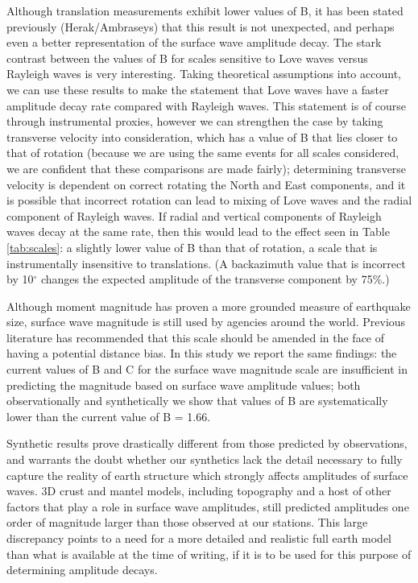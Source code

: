 \documentclass{gji}
\begin{document}
Although translation measurements exhibit lower values of B, it has been stated previously (Herak/Ambraseys) that this result is not unexpected, and perhaps even a better representation of the surface wave amplitude decay. The stark contrast between the values of B for scales sensitive to Love waves versus Rayleigh waves is very interesting. Taking theoretical assumptions into account, we can use these results to make the statement that Love waves have a faster amplitude decay rate  compared with  Rayleigh waves. This statement is of course through instrumental proxies, however we can strengthen the case by taking transverse velocity into consideration, which has a value of B that lies closer to that of rotation (because we are using the same events for all scales considered, we are confident that these comparisons are made fairly); determining transverse velocity is dependent on correct rotating the North and East components, and it is possible that incorrect rotation can lead to mixing of Love waves and the radial component of Rayleigh waves. If radial and vertical components of Rayleigh waves decay at the same rate, then this would lead to the effect seen in Table \ref{tab:scales}: a slightly lower value of B than that of rotation, a scale that is instrumentally insensitive to translations. (A backazimuth value that is incorrect by 10$^\circ$ changes the expected amplitude of the transverse component by 75\%.) %

Although moment magnitude has proven a more grounded measure of earthquake size, surface wave magnitude is still used by agencies around the world. Previous literature has recommended that this scale should be amended in the face of having a potential distance bias. In this study we report the same findings: the current values of B and C for the surface wave magnitude scale are insufficient in predicting the magnitude based on surface wave amplitude values; both observationally and synthetically we show that values of B are systematically lower than the current value of B = 1.66.

Synthetic results prove drastically different from those predicted by observations, and warrants the doubt whether our synthetics lack the detail necessary to fully capture the reality of earth structure which strongly affects amplitudes of surface waves. 3D crust and mantel models, including topography and a host of other factors that play a role in surface wave amplitudes, still predicted amplitudes one order of magnitude larger than those observed at our stations. This large discrepancy points to a need for a more detailed and realistic full earth model than what is available at the time of writing, if it is to be used for this purpose of determining amplitude decays.
\end{document}
